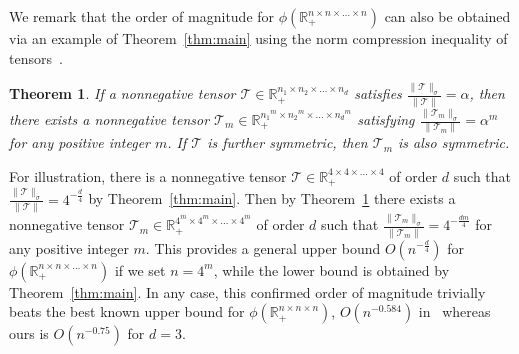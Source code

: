 \documentclass[11pt]{article}
\newtheorem{theorem}{Theorem}[section]
\newcommand{\R}{\mathbb{R}}
\newcommand{\TT}{\mathcal{T}}
\begin{document}
We remark that the order of magnitude for $\phi(\R_+^{n\times n\times \dots \times n})$ can also be obtained via an example of Theorem~\ref{thm:main} using the norm compression inequality of tensors~\cite[Theorem 5.1]{LZ20}.
\begin{theorem} \label{thm:comp}
  If a nonnegative tensor $\TT\in\R_+^{n_1\times n_2\times \dots \times n_d}$ satisfies $\frac{\|\TT\|_\sigma}{\|\TT\|} = \alpha$, then there exists a nonnegative tensor $\TT_m\in\R_+^{{n_1}^m\times {n_2}^m\times \dots \times {n_d}^m}$ satisfying $\frac{\|\TT_m\|_\sigma}{\|\TT_m\|} = \alpha^m$ for any positive integer $m$. If $\TT$ is further symmetric, then $\TT_m$ is also symmetric.
\end{theorem}
For illustration, there is a nonnegative tensor $\TT\in\R_+^{4\times 4\times \dots \times 4}$ of order $d$ such that $\frac{\|\TT\|_\sigma}{\|\TT\|}=4^{-\frac{d}{4}}$ by Theorem~\ref{thm:main}. Then by Theorem~\ref{thm:comp} there exists a nonnegative tensor $\TT_m\in\R_+^{4^m\times 4^m\times \dots \times 4^m}$ of order $d$ such that $\frac{\|\TT_m\|_\sigma}{\|\TT_m\|}=4^{-\frac{dm}{4}}$ for any positive integer $m$. This provides a general upper bound $O(n^{-\frac{d}{4}})$ for $\phi(\R_+^{n\times n\times \dots \times n})$ if we set $n=4^m$, while the lower bound is obtained by Theorem~\ref{thm:main}. In any case, this confirmed order of magnitude trivially beats the best known upper bound for $\phi(\R_+^{n\times n\times n})$, $O(n^{-0.584})$ in~\cite[Theorem 5.3]{LZ20} whereas ours is $O(n^{-0.75})$ for $d=3$.
\end{document}
